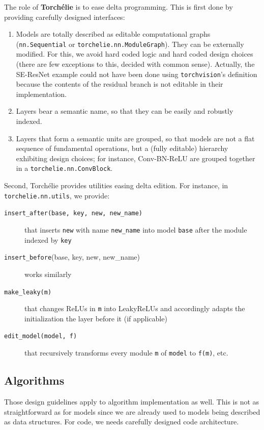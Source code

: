 The role of \textbf{Torchélie} is to ease delta programming. This is first done by providing carefully designed interfaces:
\begin{enumerate}
    \item Models are totally described as editable computational graphs (\texttt{nn.Sequential} or \texttt{torchelie.nn.ModuleGraph}). They can be externally modified. For this, we avoid hard coded logic and hard coded design choices (there are few exceptions to this, decided with common sense). Actually, the SE-ResNet example could not have been done using \texttt{torchvision}'s definition because the contents of the residual branch is not editable in their implementation.
    \item Layers bear a semantic name, so that they can be easily and robustly indexed.
    \item  Layers that form a semantic units are grouped, so that models are not a flat sequence of fundamental operations, but a (fully editable) hierarchy exhibiting design choices; for instance, Conv-BN-ReLU are grouped together in a \texttt{torchelie.nn.ConvBlock}.
\end{enumerate}

Second, Torchélie provides utilities easing delta edition. For instance, in \texttt{torchelie.nn.utils}, we provide:

\begin{description}
    \item[\texttt{insert\_after(base, key, new, new\_name)}] that inserts \texttt{new} with name \texttt{new\_name} into model \texttt{base} after the module indexed by \texttt{key}
    \item[\texttt{insert\_before}(base, key, new, new\_name)] works similarly
    \item[\texttt{make\_leaky(m)}] that changes ReLUs in \texttt{m} into LeakyReLUs and accordingly adapts the initialization the layer before it (if applicable)
    \item[\texttt{edit\_model(model, f)}] that recursively transforms every module \texttt{m} of \texttt{model} to \texttt{f(m)}, etc.
\end{description}


\subsection{Algorithms}

Those design guidelines apply to algorithm implementation as well. This is not as straightforward as for models since we are already used to models being described as data structures. For code, we needs carefully designed code architecture.

